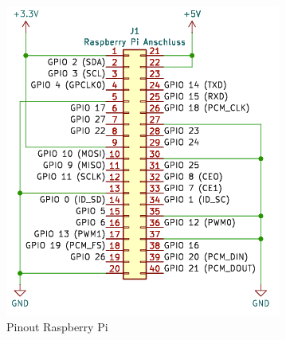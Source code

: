 \begin{figure}[H]
\begin{minipage}[b]{0.45\textwidth}
  \includegraphics[width=\textwidth]{assets/ET/Software/RaspyHat_Pinout.png}
  \caption{Pinout Raspberry Pi}
  \label{fig:Pinout Raspy Hat}
\end{minipage}
\end{figure}


